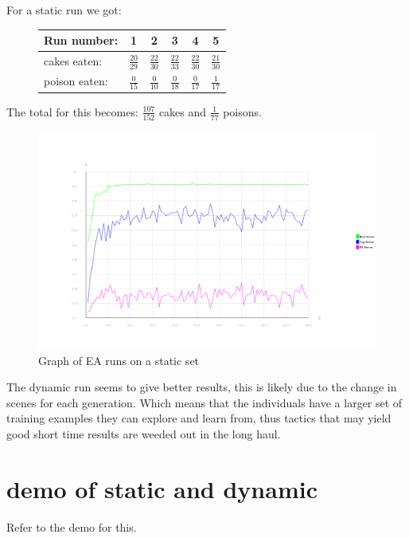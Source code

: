 \documentclass[12pt, a4paper]{article}
\begin{document}
For a static run we got:\\
\begin{figure}[H]
	\begin{center}
	\begin{tabular}{l| c|c|c|c|c}
	Run number: &  1&2 &3 &4 &5 \\ \hline
cakes eaten: &$ \frac{20}{29} $ &$ \frac{22}{30} $ &$ \frac{22}{33} $ &$ \frac{22}{30} $ &$ \frac{21}{30} $ \\ \hline
poison eaten: &$ \frac{0}{15} $ &$ \frac{0}{10} $ &$ \frac{0}{18} $ &$ \frac{0}{17} $ &$ \frac{1}{17} $ \\ 
	\end{tabular}
	\end{center}
\end{figure}
The total for this becomes: $ \frac{107}{152} $ cakes and $ \frac{1}{77} $ poisons.  
\begin{figure}[H]
\includegraphics[width=0.9\linewidth]{flatlandfalse}
\caption{Graph of EA runs on a static set}
\end{figure}

The dynamic run seems to give better results, this is likely due to the change in scenes for each generation. Which means that the individuals have a larger set of training examples they can explore and learn from, thus tactics that may yield good short time results are weeded out in the long haul.

\section{demo of static and dynamic}
Refer to the demo for this.
\end{document}
